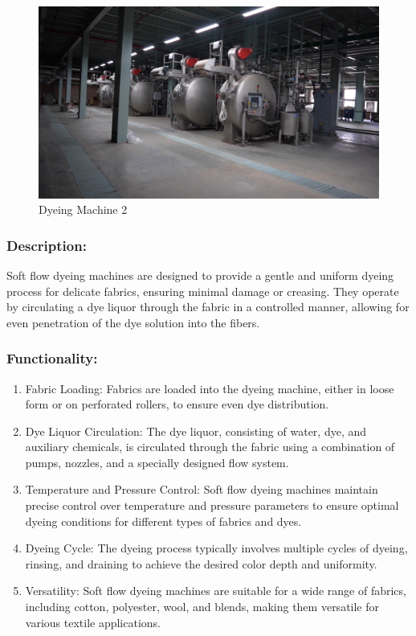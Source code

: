 \begin{figure}[h!]
  \centering
  \includegraphics[width=0.8\linewidth]{figs/dyeing.jpg}
  \caption{Dyeing Machine 2}
  \label{fig:Dyeing Machine 2}
\end{figure}

\subsubsection{Description:}


Soft flow dyeing machines are designed to provide a gentle and uniform
dyeing process for delicate fabrics, ensuring minimal damage or
creasing. They operate by circulating a dye liquor through the fabric in
a controlled manner, allowing for even penetration of the dye solution
into the fibers.


\subsubsection{Functionality:}

\begin{enumerate}
\item
  Fabric Loading: Fabrics are loaded into the dyeing machine, either in
  loose form or on perforated rollers, to ensure even dye distribution.
\item
  Dye Liquor Circulation: The dye liquor, consisting of water, dye, and
  auxiliary chemicals, is circulated through the fabric using a
  combination of pumps, nozzles, and a specially designed flow system.
\item
  Temperature and Pressure Control: Soft flow dyeing machines maintain
  precise control over temperature and pressure parameters to ensure
  optimal dyeing conditions for different types of fabrics and dyes.
\item
  Dyeing Cycle: The dyeing process typically involves multiple cycles of
  dyeing, rinsing, and draining to achieve the desired color depth and
  uniformity.
\item
  Versatility: Soft flow dyeing machines are suitable for a wide range
  of fabrics, including cotton, polyester, wool, and blends, making them
  versatile for various textile applications.
\end{enumerate}

